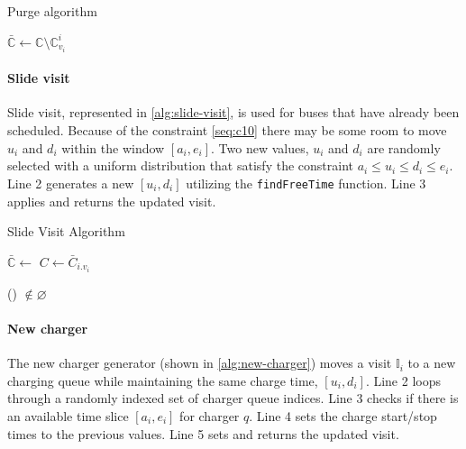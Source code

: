 \documentclass[11pt,a4paper,final]{article}
\newcommand{\I}{\mathbb{I}}                 %
\newcommand{\C}{\mathbb{C}}                 %
\newcommand{\Sol}{\mathbb{S}}               %
\begin{document}
\begin{algorithm}[H]
  \caption{Purge algorithm} \label{alg:purge}
    \LinesNumbered
    \KwIn{$\Sol$}
    \KwOut{$\bar{\Sol}$}

    \Begin
    {
        $\bar{\C} \leftarrow \C \setminus \C_{v_i}^i$
        \Return{$\bar{\C}$}
    }
  \end{algorithm}

\paragraph{Slide visit}
\label{slide-visit}
Slide visit, represented in \ref{alg:slide-visit}, is used for buses that have already been scheduled. Because of the
constraint \ref{seq:c10} there may be some room to move \(u_i\) and \(d_i\) within the window \([a_i, e_i]\). Two new values,
\(u_i\) and \(d_i\) are randomly selected with a uniform distribution that satisfy the constraint \(a_i \leq u_i \leq d_i \leq e_i\).
Line 2 generates a new \([u_i, d_i]\) utilizing the \texttt{findFreeTime} function. Line 3 applies and returns the updated visit.

\begin{algorithm}[H]
\caption{Slide Visit Algorithm} \label{alg:slide-visit}
    \LinesNumbered
    \KwIn{$\Sol$}
    \KwOut{$\bar{\Sol}$}


    \Begin
    {
      $\bar{\C} \leftarrow$\Purge{$\Sol$}
      $C \leftarrow \bar{C}_{i.v_i}$

        \If(){ $\not\in \varnothing$}
        {
          \Return{($\I_{i.q},u,d,\bar{C}$)}
        }
        \Return{($\varnothing$)}
    }
  \end{algorithm}

\paragraph{New charger}
\label{new-charger}
The new charger generator (shown in \ref{alg:new-charger}) moves a visit \(\I_i\) to a new charging queue while
maintaining the same charge time, \([u_i, d_i]\). Line 2 loops through a randomly indexed set of charger queue indices.
Line 3 checks if there is an available time slice \([a_i, e_i]\) for charger \(q\). Line 4 sets the charge start/stop times
to the previous values. Line 5 sets and returns the updated visit.
\end{document}
